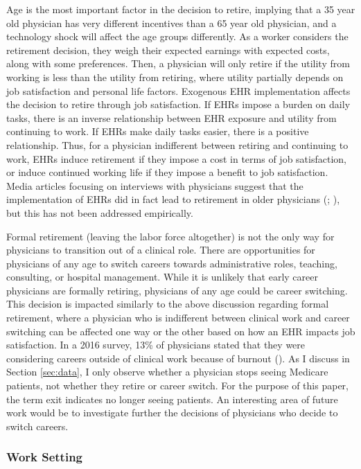 \documentclass[12pt]{article}
\begin{document}
Age is the most important factor in the decision to retire, implying that a 35 year old physician has very different incentives than a 65 year old physician, and a technology shock will affect the age groups differently. As a worker considers the retirement decision, they weigh their expected earnings with expected costs, along with some preferences. Then, a physician will only retire if the utility from working is less than the utility from retiring, where utility partially depends on job satisfaction and personal life factors. Exogenous EHR implementation affects the decision to retire through job satisfaction. If EHRs impose a burden on daily tasks, there is an inverse relationship between EHR exposure and utility from continuing to work. If EHRs make daily tasks easier, there is a positive relationship. Thus, for a physician indifferent between retiring and continuing to work, EHRs induce retirement if they impose a cost in terms of job satisfaction, or induce continued working life if they impose a benefit to job satisfaction. Media articles focusing on interviews with physicians suggest that the implementation of EHRs did in fact lead to retirement in older physicians (\cite{ringel_2019}; \cite{loria_2020}), but this has not been addressed empirically. 

Formal retirement (leaving the labor force altogether) is not the only way for physicians to transition out of a clinical role. There are opportunities for physicians of any age to switch careers towards administrative roles, teaching, consulting, or hospital management. While it is unlikely that early career physicians are formally retiring, physicians of any age could be career switching. This decision is impacted similarly to the above discussion regarding formal retirement, where a physician who is indifferent between clinical work and career switching can be affected one way or the other based on how an EHR impacts job satisfaction. In a 2016 survey, 13\% of physicians stated that they were considering careers outside of clinical work because of burnout (\cite{physicians2016physicians}). As I discuss in Section \ref{sec:data}, I only observe whether a physician stops seeing Medicare patients, not whether they retire or career switch. For the purpose of this paper, the term exit indicates no longer seeing patients. An interesting area of future work would be to investigate further the decisions of physicians who decide to switch careers.



\subsubsection{Work Setting}\label{sec:worksetting}
\end{document}
